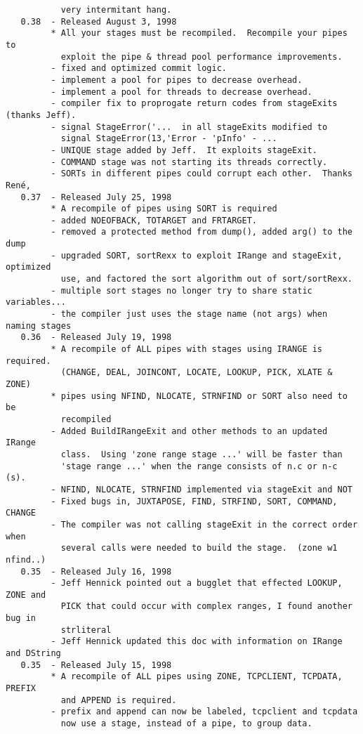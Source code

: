 \begin{verbatim}
           very intermitant hang.
   0.38  - Released August 3, 1998
         * All your stages must be recompiled.  Recompile your pipes to
           exploit the pipe & thread pool performance improvements.
         - fixed and optimized commit logic.
         - implement a pool for pipes to decrease overhead.
         - implement a pool for threads to decrease overhead.
         - compiler fix to proprogate return codes from stageExits (thanks Jeff).
         - signal StageError('...  in all stageExits modified to
           signal StageError(13,'Error - 'pInfo' - ...
         - UNIQUE stage added by Jeff.  It exploits stageExit.
         - COMMAND stage was not starting its threads correctly.
         - SORTs in different pipes could corrupt each other.  Thanks René‚
   0.37  - Released July 25, 1998
         * A recompile of pipes using SORT is required
         - added NOEOFBACK, TOTARGET and FRTARGET.
         - removed a protected method from dump(), added arg() to the dump
         - upgraded SORT, sortRexx to exploit IRange and stageExit, optimized
           use, and factored the sort algorithm out of sort/sortRexx.
         - multiple sort stages no longer try to share static variables...
         - the compiler just uses the stage name (not args) when naming stages
   0.36  - Released July 19, 1998
         * A recompile of ALL pipes with stages using IRANGE is required.
           (CHANGE, DEAL, JOINCONT, LOCATE, LOOKUP, PICK, XLATE & ZONE)
         * pipes using NFIND, NLOCATE, STRNFIND or SORT also need to be
           recompiled
         - Added BuildIRangeExit and other methods to an updated IRange
           class.  Using 'zone range stage ...' will be faster than
           'stage range ...' when the range consists of n.c or n-c (s).
         - NFIND, NLOCATE, STRNFIND implemented via stageExit and NOT
         - Fixed bugs in, JUXTAPOSE, FIND, STRFIND, SORT, COMMAND, CHANGE
         - The compiler was not calling stageExit in the correct order when
           several calls were needed to build the stage.  (zone w1 nfind..)
   0.35  - Released July 16, 1998
         - Jeff Hennick pointed out a bugglet that effected LOOKUP, ZONE and
           PICK that could occur with complex ranges, I found another bug in
           strliteral
         - Jeff Hennick updated this doc with information on IRange and DString
   0.35  - Released July 15, 1998
         * A recompile of ALL pipes using ZONE, TCPCLIENT, TCPDATA, PREFIX
           and APPEND is required.
         - prefix and append can now be labeled, tcpclient and tcpdata
           now use a stage, instead of a pipe, to group data.

\end{verbatim}
